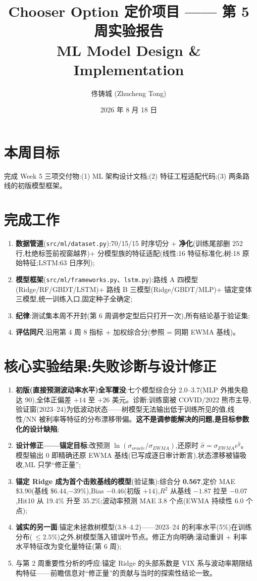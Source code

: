 \documentclass[11pt]{ctexart}
\title{\textbf{Chooser Option 定价项目 —— 第 5 周实验报告}\\
\large ML Model Design \& Implementation}
\author{佟铸城 (Zhucheng Tong)}
\date{2026 年 8 月 18 日}
\begin{document}
\maketitle

\section{本周目标}
完成 Week 5 三项交付物:(1) ML 架构设计文档;(2) 特征工程适配代码;(3) 两条路线的初版模型框架。

\section{完成工作}
\begin{enumerate}
  \item \textbf{数据管道}(\texttt{src/ml/dataset.py}):70/15/15 时序切分 + \textbf{净化}(训练尾部删 252 行,杜绝标签前视窗越界)+ 分模型族的特征适配(线性:16 特征标准化;树:18 原始特征;LSTM:63 日序列);
  \item \textbf{模型框架}(\texttt{src/ml/frameworks.py}、\texttt{lstm.py}):路线 A 四模型(Ridge/RF/GBDT/LSTM)+ 路线 B 三模型(Ridge/GBDT/MLP)+ 锚定变体三模型,统一训练入口,固定种子全确定;
  \item \textbf{纪律}:测试集本周不开封(第 6 周调参定型后只打开一次),所有结论基于验证集;
  \item \textbf{评估同尺}:沿用第 4 周 8 指标 + 加权综合分(参照 = 同期 EWMA 基线)。
\end{enumerate}

\section{核心实验结果:失败诊断与设计修正}
\begin{enumerate}
  \item \textbf{初版(直接预测波动率水平)全军覆没}:七个模型综合分 2.0--3.7(MLP 外推失稳达 90),全体正偏差 $+14$ 至 $+26$ 美元。诊断:训练窗被 COVID/2022 熊市主导,验证窗(2023--24)为低波动状态——树模型无法输出低于训练所见的值,线性/NN 被利率等特征的分布漂移带偏。\textbf{这不是调参能解决的问题,是目标参数化的设计缺陷};
  \item \textbf{设计修正——锚定目标}:改预测 $\ln(\sigma_{oracle}/\sigma_{EWMA})$,还原时 $\hat\sigma=\sigma_{EWMA}e^{\hat y}$。模型输出 0 即精确还原 EWMA 基线(已写成逐日审计断言),状态漂移被锚吸收,ML 只学``修正量'';
  \item \textbf{锚定 Ridge 成为首个击败基线的模型}(验证集):综合分 \textbf{0.567},定价 MAE \$3.90(基线 \$6.44,$-39\%$),Bias $-0.46$(初版 $+14$),$R^2$ 从基线 $-1.87$ 拉至 $-0.07$,Hit10 从 19.4\% 升至 35.2\%;波动率预测 MAE 3.8 个点(EWMA 持续性 6.0 个点);
  \item \textbf{诚实的另一面}:锚定未拯救树模型(3.8--4.2)——2023--24 的利率水平(5\%)在训练分布(\,$\leq2.5\%$)之外,树模型落入错误叶节点。修正方向明确:滚动重训 + 利率水平特征改为变化量特征(第 6 周);
  \item 与第 2 周重要性分析的呼应:锚定 Ridge 的头部系数是 VIX 系与波动率期限结构特征——前瞻信息对``修正量''的贡献与当时的探索性结论一致。
\end{enumerate}
\end{document}
